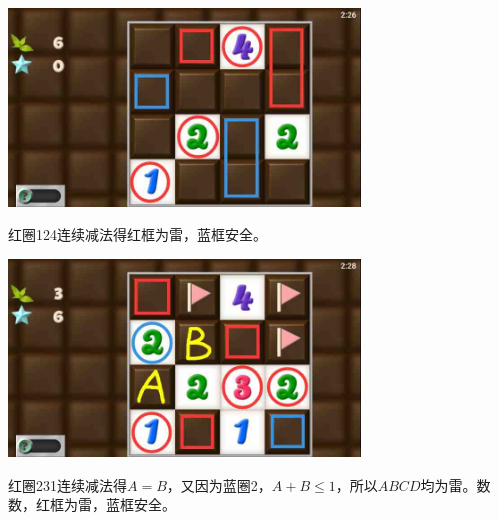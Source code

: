 \subsection{} %
\begin{center}
    \includegraphics[width=0.7\textwidth]{puzzlelow/147-1.jpg}
\end{center}
红圈124连续减法得红框为雷，蓝框安全。
\begin{center}
    \includegraphics[width=0.7\textwidth]{puzzlelow/147-2.jpg}
\end{center}
红圈231连续减法得$A=B$，又因为蓝圈2，$A+B\le 1$，所以$ABCD$均为雷。数数，红框为雷，蓝框安全。

